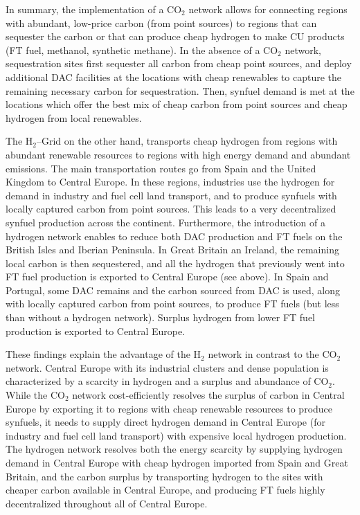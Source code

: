 \documentclass[twocolumn]{article}
\newcommand{\carbon}{CO$_2$}
\newcommand{\hydrogen}{H$_2$}
\newcommand{\hydrogengrid}{\hydrogen{}--Grid}
\begin{document}
In summary, the implementation of a \carbon{} network allows for connecting regions with abundant, low-price carbon (from point sources) to regions that can sequester the carbon or that can produce cheap hydrogen to make CU products (FT fuel, methanol, synthetic methane). In the absence of a \carbon{} network, sequestration sites first sequester all carbon from cheap point sources, and deploy additional DAC facilities at the locations with cheap renewables to capture the remaining necessary carbon for sequestration. Then, synfuel demand is met at the locations which offer the best mix of cheap carbon from point sources and cheap hydrogen from local renewables.

The \hydrogengrid{} on the other hand, transports cheap hydrogen from regions with abundant renewable resources to regions with high energy demand and abundant emissions. The main transportation routes go from Spain and the United Kingdom to Central Europe. In these regions, industries use the hydrogen for demand in industry and fuel cell land transport, and to produce synfuels with locally captured carbon from point sources. This leads to a very decentralized synfuel production across the continent. Furthermore, the introduction of a hydrogen network enables to reduce both DAC production and FT fuels on the British Isles and Iberian Peninsula. In Great Britain an Ireland, the remaining local carbon is then sequestered, and all the hydrogen that previously went into FT fuel production is exported to Central Europe (see above). In Spain and Portugal, some DAC remains and the carbon sourced from DAC is used, along with locally captured carbon from point sources, to produce FT fuels (but less than without a hydrogen network). Surplus hydrogen from lower FT fuel production is exported to Central Europe.


These findings explain the advantage of the \hydrogen{} network in contrast to the \carbon{} network. Central Europe with its industrial clusters and dense population is characterized by a scarcity in hydrogen and a surplus and abundance of \carbon. While the \carbon{} network cost-efficiently resolves the surplus of carbon in Central Europe by exporting it to regions with cheap renewable resources to produce synfuels, it needs to supply direct hydrogen demand in Central Europe (for industry and fuel cell land transport) with expensive local hydrogen production. The hydrogen network resolves both the energy scarcity by supplying hydrogen demand in Central Europe with cheap hydrogen imported from Spain and Great Britain, and the carbon surplus by transporting hydrogen to the sites with cheaper carbon available in Central Europe, and producing FT fuels highly decentralized throughout all of Central Europe.
\end{document}
